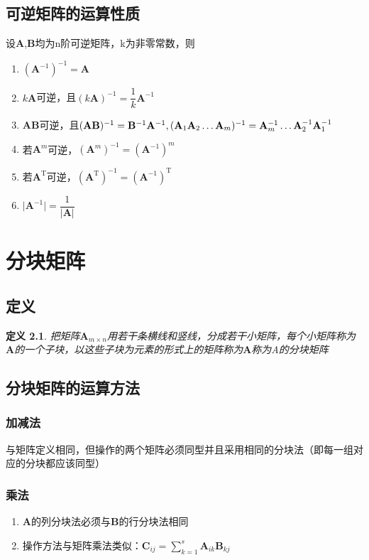 \documentclass[a4paper]{ctexbook}
\newtheorem{definition}{定义}[section]
\begin{document}
\section{可逆矩阵的运算性质}
设\(\mathbf{A}\),\(\mathbf{B}\)均为n阶可逆矩阵，k为非零常数，则
\begin{enumerate}
    \item \((\mathbf{A}^{-1})^{-1}=\mathbf{A}\)
    \item \(k\mathbf{A}\)可逆，且\((k\mathbf{A})^{-1}=\dfrac{1}{k}\mathbf{A}^{-1}\)
    \item \(\mathbf{A}\mathbf{B}\)可逆，且\((\mathbf{A}\mathbf{B})^{-1}=\mathbf{B}^{-1}\mathbf{A}^{-1},\\(\mathbf{A}_{1}\mathbf{A}_2\dots \mathbf{A}_m)^{-1}=\mathbf{A}_{m}^{-1}\dots \mathbf{A}_{2}^{-1}\mathbf{A}_{1}^{-1}\)
    \item 若\(\mathbf{A}^m\)可逆，\((\mathbf{A}^{m})^{-1}=(\mathbf{A}^{-1})^{m}\)
    \item 若\(\mathbf{A}^\mathrm{T}\)可逆，\((\mathbf{A}^\mathrm{T})^{-1}=(\mathbf{A}^{-1})^\mathrm{T}\)
    \item \(\rvert \mathbf{A}^{-1}\rvert=\dfrac{1}{\rvert \mathbf{A} \rvert}\)
\end{enumerate}

\chapter{分块矩阵}
\section{定义}
\begin{definition}
    把矩阵\(\mathbf{A}_{m \times n}\)用若干条横线和竖线，分成若干小矩阵，每个小矩阵称为\(\mathbf{A}\)的一个子块，以这些子块为元素的形式上的矩阵称为\(\mathbf{A}\)称为A的分块矩阵
\end{definition}
\section{分块矩阵的运算方法}
\subsection{加减法}
与矩阵定义相同，但操作的两个矩阵必须同型并且采用相同的分块法（即每一组对应的分块都应该同型）
\subsection{乘法}
\begin{enumerate}
    \item \(\mathbf{A}\)的列分块法必须与\(\mathbf{B}\)的行分块法相同
    \item 操作方法与矩阵乘法类似：\(\mathbf{C}_{ij}=\sum\limits_{k=1}^s \mathbf{A}_{ik}\mathbf{B}_{kj}\)
\end{enumerate}
\end{document}
